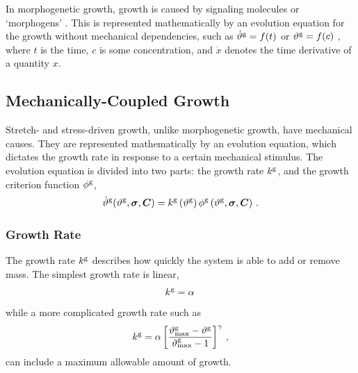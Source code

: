 \documentclass[10pt,letterpaper,oneside]{report}
\newcommand{\ten}[1]{\mbox{\boldmath $#1$}{}}
\newcommand{\scas}[1]{\mbox{{\scriptsize{${\rm{#1}}$}}}{}}
\begin{document}

In morphogenetic growth, growth is caused by signaling molecules or `morphogens' \cite{Taber1995}.  This is represented mathematically by an evolution equation for the growth without mechanical dependencies, such as
$\dot{\vartheta}^{\scas{g}} = f(t)$ or $\vartheta^{\scas{g}} = f(c)$ , 
where $t$ is the time, $c$ is some concentration, and $\dot{x}$ denotes the time derivative of a quantity $x$.  

\subsection{Mechanically-Coupled Growth}
Stretch- and stress-driven growth, unlike morphogenetic growth, have mechanical causes.  They are represented mathematically by an evolution equation, which dictates the growth rate in response to a certain mechanical stimulus.  The evolution equation is divided into two parts: the growth rate $k^{\scas{g}}$, and the growth criterion function $\phi^{\scas{g}}$,
\begin{equation}
\dot{\vartheta}^{\scas{g}} ( \vartheta^{\scas{g}}, \ten{\sigma}, \ten{C} ) = k^{\scas{g}} \left( \vartheta^{\scas{g}} \right) \phi^{\scas{g}} \left( \vartheta^{\scas{g}}, \ten{\sigma}, \ten{C} \right) \, . 
\end{equation}

\subsubsection{Growth Rate}
\label{subsec:rate}
The growth rate $k^{\scas{g}}$ describes how quickly the system is able to add or remove mass.  The simplest growth rate is linear, 
\begin{equation}
k^{\scas{g}} = \alpha \, 
\end{equation}
while a more complicated growth rate such as 
\begin{equation}
k^{\scas{g}} = \alpha \left[ \frac{ \vartheta^{\scas{g}}_{\scas{max}} - \vartheta^{\scas{g}} }{ \vartheta^{\scas{g}}_{\scas{max}} - 1} \right]^{\gamma} \, ,  
\end{equation}
can include a maximum allowable amount of growth.
\end{document}
